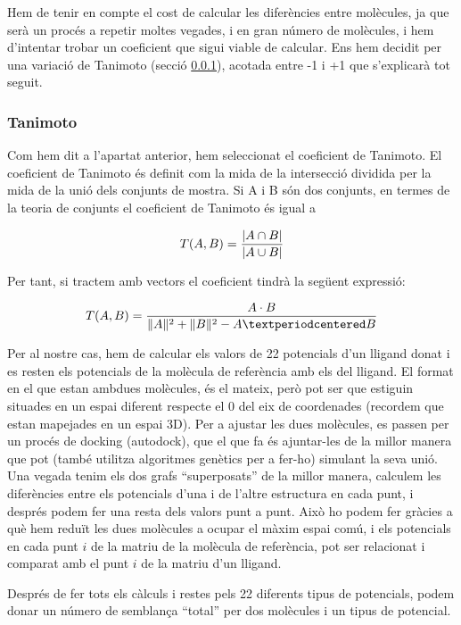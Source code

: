 Hem de tenir en compte el cost de calcular les diferències entre
molècules, ja que serà un procés a repetir moltes vegades, i en gran
número de molècules, i hem d'intentar trobar un coeficient que sigui
viable de calcular.  Ens hem decidit per una variació de Tanimoto
(secció \ref{ssub:Tanimoto}), acotada entre -1 i +1 que s'explicarà tot seguit.


\subsubsection{Tanimoto} %
\label{ssub:Tanimoto}

Com hem dit a l'apartat anterior, hem seleccionat el coeficient de
Tanimoto. El coeficient de Tanimoto és definit com la mida de la
intersecció dividida per la mida de la unió dels conjunts de
mostra. Si A i B són dos conjunts, en termes de la teoria de conjunts
el coeficient de Tanimoto és igual a

$$T(A,B)={|A\cap B| \over |A\cup B|}$$

Per tant, si tractem amb vectors el coeficient tindrà la següent expressió: 

$$T(A,B)={A \cdot B \over \|A\|^{2} + \|B\|^{2} - A·B}$$

Per al nostre cas, hem de calcular els valors de 22 potencials d'un lligand
donat i es resten els
potencials de la molècula de referència amb els del lligand.  El format en el
que estan ambdues molècules, és el mateix, però pot ser que estiguin situades en
un espai diferent respecte el 0 del eix de coordenades (recordem que estan
mapejades en un espai 3D).  Per a ajustar les dues molècules, es passen per un
procés de docking (autodock), que el que fa és ajuntar-les de la millor manera que pot
(també utilitza algoritmes genètics per a fer-ho) simulant la seva unió. Una
vegada tenim els dos grafs ``superposats'' de la millor manera, calculem les
diferències entre els potencials d'una i de l'altre estructura en cada punt, i
després podem fer una resta dels valors punt a punt.  Això ho podem fer gràcies
a què hem reduït les dues molècules a ocupar el màxim espai comú, i els
potencials en cada punt $i$ de la matriu de la molècula de referència, pot ser
relacionat i comparat amb el punt $i$ de la matriu d'un lligand.

Després de fer tots els càlculs i restes pels 22 diferents tipus de potencials,
podem donar un número de semblança ``total'' per dos molècules i un tipus de
potencial.

